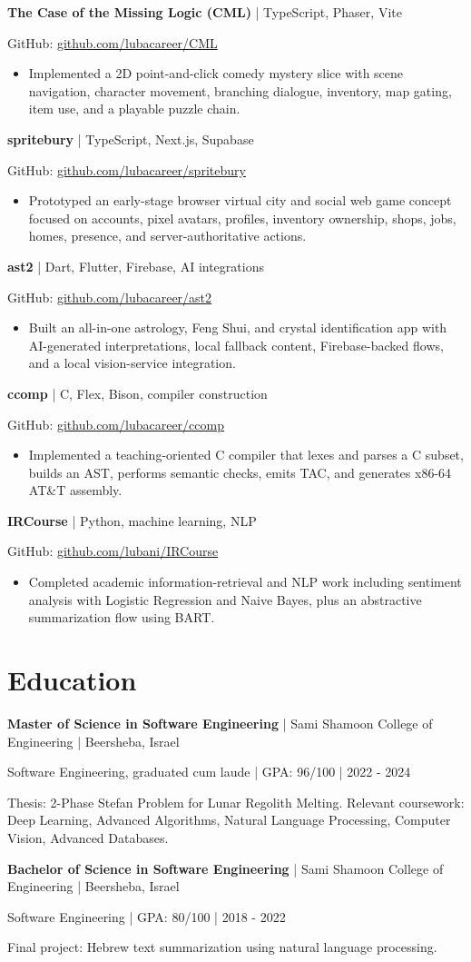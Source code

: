 \documentclass[11pt,a4paper]{article}
\newcommand{\projectentry}[4]{%
  \Needspace{4\baselineskip}
  \textbf{#1} | #2\par
  GitHub: #3\par
  \begin{itemize}
    #4
  \end{itemize}
}
\newcommand{\educationentry}[6]{%
  \Needspace{4\baselineskip}
  \textbf{#1} | #2 | #3\par
  #4 | GPA: #5 | #6\par
}
\begin{document}
\projectentry{The Case of the Missing Logic (CML)}{TypeScript, Phaser, Vite}{\href{https://github.com/lubacareer/CML}{github.com/lubacareer/CML}}{
  \item Implemented a 2D point-and-click comedy mystery slice with scene navigation, character movement, branching dialogue, inventory, map gating, item use, and a playable puzzle chain.
}

\projectentry{spritebury}{TypeScript, Next.js, Supabase}{\href{https://github.com/lubacareer/spritebury}{github.com/lubacareer/spritebury}}{
  \item Prototyped an early-stage browser virtual city and social web game concept focused on accounts, pixel avatars, profiles, inventory ownership, shops, jobs, homes, presence, and server-authoritative actions.
}

\projectentry{ast2}{Dart, Flutter, Firebase, AI integrations}{\href{https://github.com/lubacareer/ast2}{github.com/lubacareer/ast2}}{
  \item Built an all-in-one astrology, Feng Shui, and crystal identification app with AI-generated interpretations, local fallback content, Firebase-backed flows, and a local vision-service integration.
}

\projectentry{ccomp}{C, Flex, Bison, compiler construction}{\href{https://github.com/lubacareer/ccomp}{github.com/lubacareer/ccomp}}{
  \item Implemented a teaching-oriented C compiler that lexes and parses a C subset, builds an AST, performs semantic checks, emits TAC, and generates x86-64 AT\&T assembly.
}

\projectentry{IRCourse}{Python, machine learning, NLP}{\href{https://github.com/lubani/IRCourse}{github.com/lubani/IRCourse}}{
  \item Completed academic information-retrieval and NLP work including sentiment analysis with Logistic Regression and Naive Bayes, plus an abstractive summarization flow using BART.
}

\section*{Education}
\educationentry{Master of Science in Software Engineering}{Sami Shamoon College of Engineering}{Beersheba, Israel}{Software Engineering, graduated cum laude}{96/100}{2022 - 2024}
Thesis: 2-Phase Stefan Problem for Lunar Regolith Melting. Relevant coursework: Deep Learning, Advanced Algorithms, Natural Language Processing, Computer Vision, Advanced Databases.\par
\vspace{1pt}
\educationentry{Bachelor of Science in Software Engineering}{Sami Shamoon College of Engineering}{Beersheba, Israel}{Software Engineering}{80/100}{2018 - 2022}
Final project: Hebrew text summarization using natural language processing.\par
\end{document}
